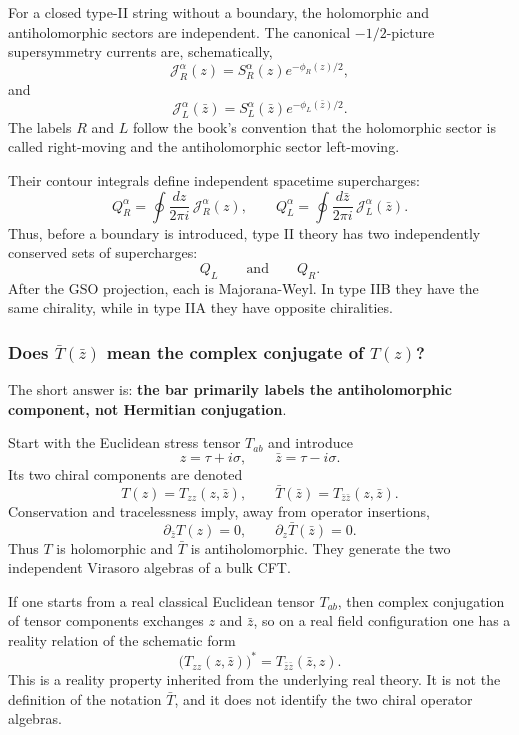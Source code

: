 \documentclass[
  10pt,
  a4paper,
  openany]{book}
\begin{document}
For a closed type-II string without a boundary, the holomorphic and
antiholomorphic sectors are independent. The canonical \(-1/2\)-picture
supersymmetry currents are, schematically, \[
\mathcal J_R^\alpha(z)
=S_R^\alpha(z)e^{-\phi_R(z)/2},
\] and \[
\mathcal J_L^\alpha(\bar z)
=S_L^\alpha(\bar z)e^{-\phi_L(\bar z)/2}.
\] The labels \(R\) and \(L\) follow the book's convention that the
holomorphic sector is called right-moving and the antiholomorphic sector
left-moving.

Their contour integrals define independent spacetime supercharges: \[
Q_R^\alpha
=\oint\frac{dz}{2\pi i}\,
\mathcal J_R^\alpha(z),
\qquad
Q_L^\alpha
=\oint\frac{d\bar z}{2\pi i}\,
\mathcal J_L^\alpha(\bar z).
\] Thus, before a boundary is introduced, type II theory has two
independently conserved sets of supercharges: \[
Q_L
\qquad\text{and}\qquad
Q_R.
\] After the GSO projection, each is Majorana-Weyl. In type IIB they
have the same chirality, while in type IIA they have opposite
chiralities.

\subsubsection{\texorpdfstring{Does \(\bar T(\bar z)\) mean the complex
conjugate of
\(T(z)\)?}{Does \textbackslash bar T(\textbackslash bar z) mean the complex conjugate of T(z)?}}\label{does-bar-tbar-z-mean-the-complex-conjugate-of-tz}

The short answer is: \textbf{the bar primarily labels the
antiholomorphic component, not Hermitian conjugation}.

Start with the Euclidean stress tensor \(T_{ab}\) and introduce \[
z=\tau+i\sigma,
\qquad
\bar z=\tau-i\sigma.
\] Its two chiral components are denoted \[
T(z)=T_{zz}(z,\bar z),
\qquad
\bar T(\bar z)=T_{\bar z\bar z}(z,\bar z).
\] Conservation and tracelessness imply, away from operator insertions,
\[
\partial_{\bar z}T(z)=0,
\qquad
\partial_z\bar T(\bar z)=0.
\] Thus \(T\) is holomorphic and \(\bar T\) is antiholomorphic. They
generate the two independent Virasoro algebras of a bulk CFT.

If one starts from a real classical Euclidean tensor \(T_{ab}\), then
complex conjugation of tensor components exchanges \(z\) and \(\bar z\),
so on a real field configuration one has a reality relation of the
schematic form \[
\bigl(T_{zz}(z,\bar z)\bigr)^*
=T_{\bar z\bar z}(\bar z,z).
\] This is a reality property inherited from the underlying real theory.
It is not the definition of the notation \(\bar T\), and it does not
identify the two chiral operator algebras.
\end{document}
